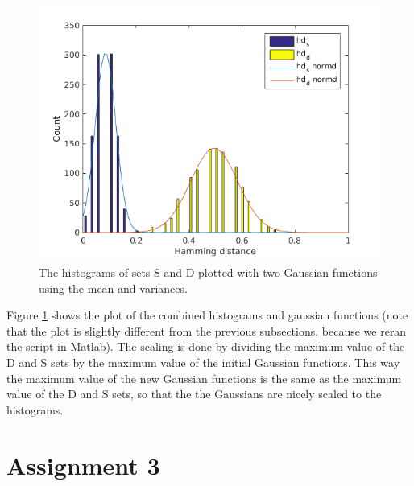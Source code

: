 \documentclass{article}
\begin{document}
\begin{figure}[H]
	\centering
	\includegraphics[width=\linewidth]{2_6.png}
	\caption{The histograms of sets S and D plotted with two Gaussian functions using the mean and variances.}
	\label{fig2.6}
\end{figure}
Figure \ref{fig2.6} shows the plot of the combined histograms and gaussian functions (note that the plot is slightly different from the previous subsections, because we reran the script in Matlab). The scaling is done by dividing the maximum value of the D and S sets by the maximum value of the initial Gaussian functions. This way the maximum value of the new Gaussian functions is the same as the maximum value of the D and S sets, so that the the Gaussians are nicely scaled to the histograms.

\subsection{}
\subsubsection{}


\subsection{}

\section{Assignment 3}
\end{document}
